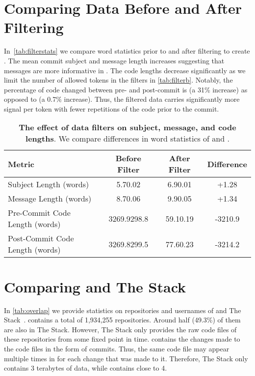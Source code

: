 \section{Comparing Data Before and After Filtering}

In~\autoref{tab:filterstats} we compare word statistics prior to and after filtering \data{} to create \dataft{}. The mean commit subject and message length increases suggesting that messages are more informative in \dataft{}. The code lengths decrease significantly as we limit the number of allowed tokens in the filters in \autoref{tab:filterb}. Notably, the percentage of code changed between pre- and post-commit is  (a 31\% increase) as opposed to  (a 0.7\% increase). Thus, the filtered data carries significantly more signal per token with fewer repetitions of the code prior to the commit.

\begin{table*}[htbp]
    \centering
    \begin{tabular}{l|ccc}
    \toprule
    Metric & Before Filter & After Filter & Difference \\
    \midrule
    Subject Length (words) & 5.70.02 & 6.90.01 & +1.28 \\
    Message Length (words) & 8.70.06 & 9.90.05 & +1.34 \\
    Pre-Commit Code Length (words) & 3269.9298.8 & 59.10.19 & -3210.9 \\
    Post-Commit Code Length (words) & 3269.8299.5 & 77.60.23 & -3214.2 \\   
    \bottomrule
    \end{tabular}
\caption{
        \textbf{The effect of data filters on subject, message, and code lengths}. We compare differences in word statistics of \data{} and \dataft{}.
    }
    \label{tab:filterstats}
\end{table*}



\section{Comparing \data{} and The Stack}
\label{sec:stack}

In \autoref{tab:overlap} we provide statistics on repositories and usernames of \data{} and The Stack~\citep{kocetkov2022stack}. \data{} contains a total of 1,934,255 repositories. Around half (49.3\%) of them are also in The Stack. However, The Stack only provides the raw code files of these repositories from some fixed point in time. \data{} contains the changes made to the code files in the form of commits. Thus, the same code file may appear multiple times in \data{} for each change that was made to it. Therefore, The Stack only contains 3 terabytes of data, while \data{} contains close to 4.

